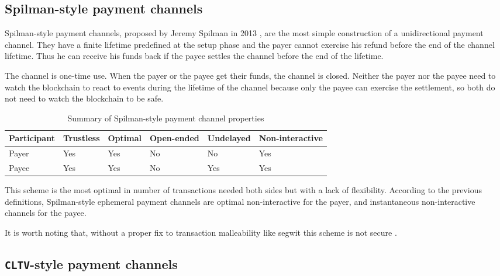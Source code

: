 \documentclass{llncs}
\begin{document}
\subsection{Spilman-style payment channels}

Spilman-style payment channels, proposed by Jeremy Spilman in 2013 \cite{SpilmanStyle}, are the most simple construction of a unidirectional payment channel. They have a finite lifetime predefined at the setup phase and the payer cannot exercise his refund before the end of the channel lifetime. Thus he can receive his funds back if the payee settles the channel before the end of the lifetime.

The channel is one-time use. When the payer or the payee get their funds, the channel is closed. Neither the payer nor the payee need to watch the blockchain to react to events during the lifetime of the channel because only the payee can exercise the settlement, so both do not need to watch the blockchain to be safe.

\begin{table}[ht]
  \begin{tabularx}{\textwidth}{ | X | l | l | l | l | l |}
  \hline
  Participant & Trustless & Optimal & Open-ended & Undelayed & Non-interactive \\
  \hline \hline
  Payer & Yes & Yes & No & No & Yes \\ \hline
  Payee & Yes & Yes & No & Yes & Yes \\
  \hline
  \end{tabularx}
  \caption{Summary of Spilman-style payment channel properties}
  \label{fig:summarySpilmanPaymentChannel}
\end{table}

This scheme is the most optimal in number of transactions needed both sides but with a lack of flexibility. According to the previous definitions, Spilman-style ephemeral payment channels are optimal non-interactive for the payer, and instantaneous non-interactive channels for the payee.

It is worth noting that, without a proper fix to transaction malleability like \gls{segwit} this scheme is not secure \cite{SegWitBIP, BIP62, DBLP:journals/corr/AndrychowiczDMM13, DBLP:journals/corr/DeckerW14}.

\subsection{\texttt{CLTV}-style payment channels}
\end{document}
